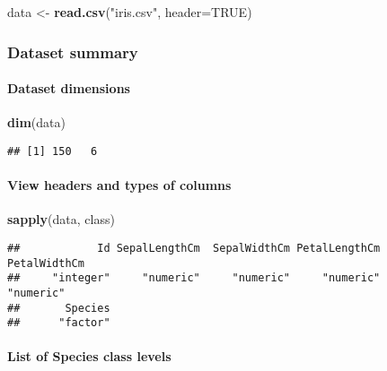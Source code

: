 \documentclass[]{article}
\newenvironment{Shaded}{\begin{snugshade}}{\end{snugshade}}
\newcommand{\KeywordTok}[1]{\textcolor[rgb]{0.13,0.29,0.53}{\textbf{#1}}}
\newcommand{\DataTypeTok}[1]{\textcolor[rgb]{0.13,0.29,0.53}{#1}}
\newcommand{\StringTok}[1]{\textcolor[rgb]{0.31,0.60,0.02}{#1}}
\newcommand{\OtherTok}[1]{\textcolor[rgb]{0.56,0.35,0.01}{#1}}
\newcommand{\NormalTok}[1]{#1}
\let\oldparagraph\paragraph
\renewcommand{\paragraph}[1]{\oldparagraph{#1}\mbox{}}
\begin{document}
\begin{Shaded}
\begin{Highlighting}[]
\NormalTok{data <-}\StringTok{ }\KeywordTok{read.csv}\NormalTok{(}\StringTok{"iris.csv"}\NormalTok{, }\DataTypeTok{header=}\OtherTok{TRUE}\NormalTok{)}
\end{Highlighting}
\end{Shaded}

\subsubsection{Dataset summary}\label{dataset-summary}

\paragraph{Dataset dimensions}\label{dataset-dimensions}

\begin{Shaded}
\begin{Highlighting}[]
\KeywordTok{dim}\NormalTok{(data)}
\end{Highlighting}
\end{Shaded}

\begin{verbatim}
## [1] 150   6
\end{verbatim}

\paragraph{View headers and types of
columns}\label{view-headers-and-types-of-columns}

\begin{Shaded}
\begin{Highlighting}[]
\KeywordTok{sapply}\NormalTok{(data, class)}
\end{Highlighting}
\end{Shaded}

\begin{verbatim}
##            Id SepalLengthCm  SepalWidthCm PetalLengthCm  PetalWidthCm 
##     "integer"     "numeric"     "numeric"     "numeric"     "numeric" 
##       Species 
##      "factor"
\end{verbatim}

\paragraph{List of Species class
levels}\label{list-of-species-class-levels}
\end{document}
